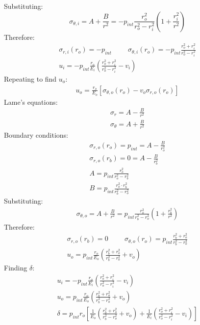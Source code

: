 \documentclass[11pt]{article}
\numberwithin{equation}{section}
\begin{document}
Substituting:
\begin{equation}
    \sigma_{\theta,i} = A + \frac{B}{r^2} = -p_{int}\frac{r_o^2}{r_o^2 - r_i^2} \left(1 + \frac{r_i^2}{r^2}\right) \label{eq:q2ii1}
\end{equation}
Therefore:
\begin{gather}
    \sigma_{r,i}(r_o) = -p_{int} \hspace{1cm} \sigma_{\theta,i}(r_o) = -p_{int}\frac{r_o^2 + r_i^2}{r_o^2 - r_i^2}\\
    u_i = -p_{int} \frac{r_o}{E_i} \left(\frac{r_o^2 + r_i^2}{r_o^2 - r_i^2} - v_i\right)
\end{gather}
Repeating to find $u_o$:
\begin{gather}
    u_o = \frac{r_o}{E_o}\left[\sigma_{\theta,o} (r_o) - v_o \sigma_{r,o}(r_o)\right]
\end{gather}
Lame's equations:
\begin{gather}
    \sigma_r = A - \frac{B}{r^2}\\
    \sigma_{\theta} = A + \frac{B}{r^2}
\end{gather}
Boundary conditions:
\begin{gather}
    \sigma_{r,o}(r_o) = p_{int} = A - \frac{B}{r_o^2}\\
    \sigma_{r,o}(r_b) = 0 = A - \frac{B}{r_b^2}\\
    A = p_{int} \frac{r_o^2}{r_o^2- r_b^2}\\
    B = p_{int} \frac{r_o^2 \cdot r_b^2}{r_b^2 - r_o^2}
\end{gather}
Substituting:
\begin{gather}
    \sigma_{\theta,o} = A + \frac{B}{r^2} = p_{int} \frac{r_o^2}{r_b^2 - r_o^2} \left(1+ \frac{r_b^2}{r^2}\right) \label{eq:q2ii2}
\end{gather}
Therefore:
\begin{gather}
    \sigma_{r,o}(r_b) = 0 \hspace{1cm} \sigma_{\theta,o}(r_o) = p_{int}\frac{r_b^2 + r_o^2}{r_b^2 -r_o^2}\\
    u_o = p_{int} \frac{r_o}{E_o}\left(\frac{r_b^2 + r_o^2}{r_b^2 - r_o^2} + v_o\right)
\end{gather}
Finding $\delta$:
\begin{gather}
    u_i =-p_{int}\frac{r_o}{E_i}\left(\frac{r_o^2 + r_i^2 }{r_o^2 - r_i^2}-v_i\right)\\
    u_o = p_{int}\frac{r_o}{E_o}\left(\frac{r_b^2 + r_o^2 }{r_b^2 - r_o^2}+v_o\right)\\
    \delta = p_{int}r_o\left[\frac{1}{E_o}\left(\frac{r_b^2 + r_o^2}{r_b^2 - r_o^2}+v_o\right) + \frac{1}{E_i}\left(\frac{r_o^2 + r_i^2}{r_o^2 - r_i^2}-v_i\right)\right]
\end{gather}
\end{document}
